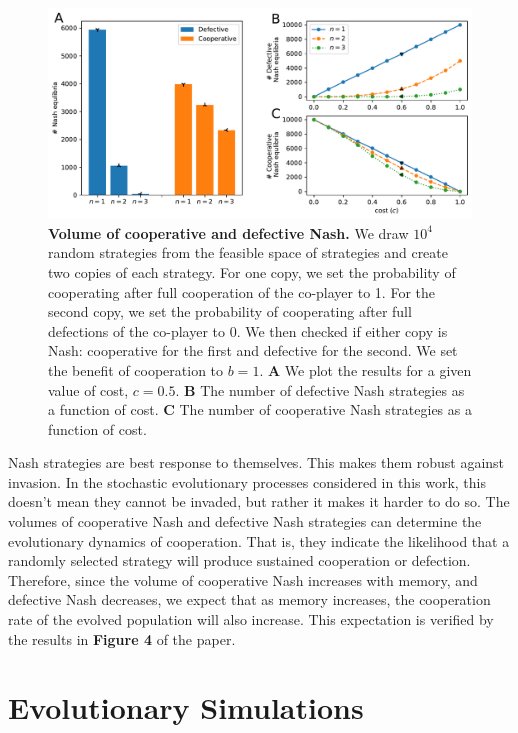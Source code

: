 \documentclass[11pt]{article}
\theoremstyle{plainCl1}
\theoremstyle{plainCl2}
\begin{document}
\begin{figure}[t]
  \centering
  \includegraphics[width=\textwidth]{../../figures/siFig1.pdf}
  \caption{
  \textbf{Volume of cooperative and defective Nash.}
We draw \(10^4\) random
strategies from the feasible space of strategies and create two copies of each
strategy. For one copy, we set the probability of cooperating after full
cooperation of the co-player to 1. For the second copy, we set the probability
of cooperating after full defections of the co-player to 0. We then checked if
either copy is Nash: cooperative for the first and defective for the second. We
set the benefit of cooperation to \(b = 1\). 
{\bf A} We plot the results for a given value of cost, \(c = 0.5\).
{\bf B} The number of defective Nash strategies as a function of cost.
{\bf C} The number of cooperative Nash strategies as a function of cost.
}\label{fig:reactive_volume}
\end{figure}

\noindent
Nash strategies are best response to themselves. This makes them robust against
invasion. In the stochastic evolutionary processes considered in this work, this
doesn't mean they cannot be invaded, but rather it makes it harder to do so. The
volumes of cooperative Nash and defective Nash strategies can determine the
evolutionary dynamics of cooperation. That is, they indicate the likelihood that
a randomly selected strategy will produce sustained cooperation or defection.
Therefore, since the volume of cooperative Nash increases with memory, and
defective Nash decreases, we expect that as memory increases, the cooperation
rate of the evolved population will also increase. This expectation is verified
by the results in \textbf{Figure 4} of the paper.



\section{Evolutionary Simulations}
\end{document}

